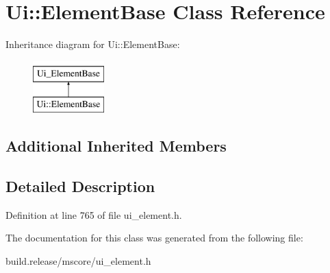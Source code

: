 \hypertarget{class_ui_1_1_element_base}{}\section{Ui\+:\+:Element\+Base Class Reference}
\label{class_ui_1_1_element_base}
Inheritance diagram for Ui\+:\+:Element\+Base\+:\begin{figure}[H]
\begin{center}
\leavevmode
\includegraphics[height=2.000000cm]{class_ui_1_1_element_base}
\end{center}
\end{figure}
\subsection*{Additional Inherited Members}


\subsection{Detailed Description}


Definition at line 765 of file ui\+\_\+element.\+h.



The documentation for this class was generated from the following file\+:\begin{DoxyCompactItemize}
\item 
build.\+release/mscore/ui\+\_\+element.\+h\end{DoxyCompactItemize}
